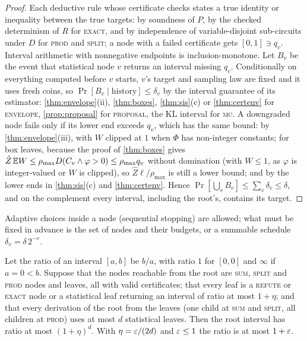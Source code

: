 \begin{proof}
Each deductive rule whose certificate checks states a true identity or
inequality between the true targets: by soundness of $P$, by the checked
determinism of $R$ for \textsc{exact}, and by independence of
variable-disjoint sub-circuits under $D$ for \textsc{prod} and \textsc{split}; a
node with a failed certificate gets $[0,1]\ni q_v$. Interval arithmetic with
nonnegative endpoints is inclusion-monotone. Let $B_v$ be the event that
statistical node $v$ returns an interval missing $q_v$. Conditionally on
everything computed before $v$ starts, $v$'s target and sampling law are fixed
and it uses fresh coins, so $\Pr[B_v\mid\text{history}]\le\delta_v$ by the interval
guarantee of its estimator: \cref{thm:envelope}(ii), \cref{thm:boxes},
\cref{thm:sis}(c) or \cref{thm:certenv} for \textsc{envelope},
\cref{prop:proposal} for \textsc{proposal}, the KL interval for \textsc{mc}. A
downgraded node fails only if its lower end exceeds $q_v$, which has the same
bound: by \cref{thm:envelope}(iii), with $W$ clipped at $1$ when $\Phi$ has
non-integer constants; for box leaves, because the proof of \cref{thm:boxes} gives
$\hat Z\,\mathbb{E} W\le\rho_{\max}D(C_v\wedge\varphi>0)\le\rho_{\max}q_v$ without domination
(with $W\le1$, as $\varphi$ is integer-valued or $W$ is clipped), so $\hat
Z\ell/\rho_{\max}$ is still a lower bound; and by the lower ends in \cref{thm:sis}(c)
and \cref{thm:certenv}. Hence
$\Pr[\bigcup_vB_v]\le\sum_v\delta_v\le\delta$, and on the complement every interval,
including the root's, contains its target.
\end{proof}

Adaptive choices inside a node (sequential stopping) are allowed; what must
be fixed in advance is the set of nodes and their budgets, or a summable
schedule $\delta_v=\delta\,2^{-v}$.

\begin{proposition}\label{prop:calculus}
Let the ratio of an interval $[a,b]$ be $b/a$, with ratio $1$ for $[0,0]$ and
$\infty$ if $a=0<b$. Suppose that the nodes reachable from the root are
\textup{\textsc{sum}}, \textup{\textsc{split}} and \textup{\textsc{prod}} nodes and leaves, all with valid
certificates; that every leaf is a \textup{\textsc{refute}} or \textup{\textsc{exact}} node or a
statistical leaf returning an interval of ratio at most $1+\eta$; and that every
derivation of the root from the leaves (one child at \textup{\textsc{sum}} and
\textup{\textsc{split}}, all children at \textup{\textsc{prod}}) uses at most $d$ statistical
leaves. Then the root interval has ratio at most $(1+\eta)^d$. With
$\eta=\varepsilon/(2d)$ and $\varepsilon\le1$ the ratio is at most $1+\varepsilon$.
\end{proposition}

